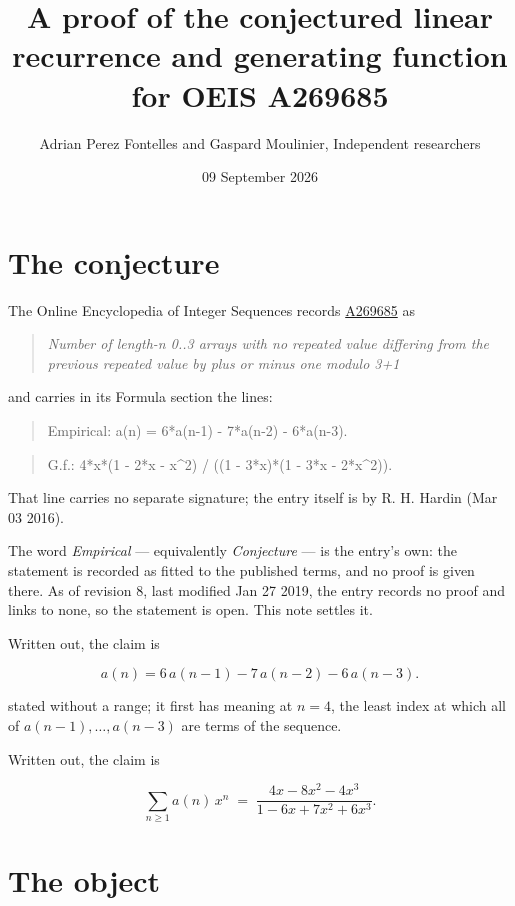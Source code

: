 \documentclass[11pt]{article}
\title{A proof of the conjectured linear recurrence and generating function for OEIS A269685}
\author{Adrian Perez Fontelles and Gaspard Moulinier, Independent researchers}
\date{09 September 2026}
\theoremstyle{definition}
\begin{document}
\maketitle
\section{The conjecture}

The Online Encyclopedia of Integer Sequences records \href{https://oeis.org/A269685}{A269685} as

\begin{quote}\itshape Number of length-n 0..3 arrays with no repeated value differing from the previous repeated value by plus or minus one modulo 3+1\end{quote}

and carries in its Formula section the lines:

\begin{quote}\ttfamily Empirical: a(n) = 6*a(n-1) - 7*a(n-2) - 6*a(n-3).\end{quote}

\begin{quote}\ttfamily G.f.: 4*x*(1 - 2*x - x\textasciicircum{}2) / ((1 - 3*x)*(1 - 3*x - 2*x\textasciicircum{}2)).\end{quote}

That line carries no separate signature; the entry itself is by R. H. Hardin (Mar 03 2016).

The word {\itshape Empirical} --- equivalently {\itshape Conjecture} --- is the entry's own: the statement is recorded as fitted to the published terms, and no proof is given there. As of revision 8, last modified Jan 27 2019, the entry records no proof and links to none, so the statement is open. This note settles it.

Written out, the claim is

\[a(n) = 6\,a(n-1) - 7\,a(n-2) - 6\,a(n-3).\]

stated without a range; it first has meaning at $n = 4$, the least index at which all of $a(n-1),\dots,a(n-3)$ are terms of the sequence.

Written out, the claim is

\[\sum_{n \ge 1} a(n)\,x^n \;=\; \frac{4x - 8x^{2} - 4x^{3}}{1 - 6x + 7x^{2} + 6x^{3}}.\]

\section{The object}
\end{document}
